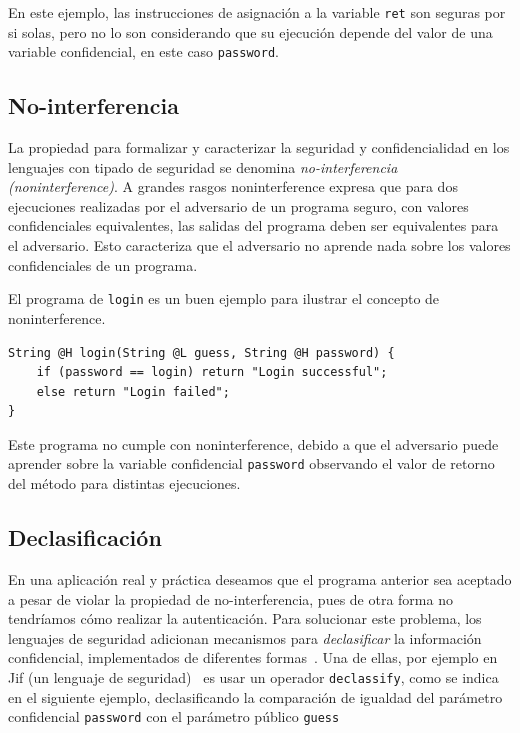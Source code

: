 	En este ejemplo, las instrucciones de asignación a la variable \texttt{ret} son seguras por si solas, pero no lo son considerando que su ejecución depende del valor de una variable confidencial, en este caso \texttt{password}.

	\subsection{No-interferencia}
	La propiedad para formalizar y caracterizar la seguridad y confidencialidad en los lenguajes con tipado de seguridad se denomina \textit{no-interferencia (noninterference)}. A grandes rasgos noninterference expresa que para dos ejecuciones realizadas por el adversario de un programa seguro, con valores confidenciales equivalentes, las salidas del programa deben ser equivalentes para el adversario. Esto caracteriza que el adversario no aprende nada sobre los valores confidenciales de un programa.

	El programa de \texttt{login} es un buen ejemplo para ilustrar el concepto de noninterference.

	\begin{lstlisting}
String @H login(String @L guess, String @H password) {
	if (password == login) return "Login successful";
	else return "Login failed";
}
	\end{lstlisting}

	Este programa no cumple con noninterference, debido a que el adversario puede aprender sobre la variable confidencial \texttt{password} observando el valor de retorno del método para distintas ejecuciones.

	\subsection{Declasificación}
	En una aplicación real y práctica deseamos que el programa anterior sea aceptado a pesar de violar la propiedad de no-interferencia, pues de otra forma no tendríamos cómo realizar la autenticación. Para solucionar este problema, los lenguajes de seguridad adicionan mecanismos para \textit{declasificar} la información confidencial, implementados de diferentes formas~\cite{sabelfeldSands:JCS09}. Una de ellas, por ejemplo en Jif (un lenguaje de seguridad)~\cite{jif} es usar un operador \texttt{declassify}, como se indica en el siguiente ejemplo, declasificando la comparación de igualdad del parámetro confidencial \texttt{password} con el parámetro público \texttt{guess} %

